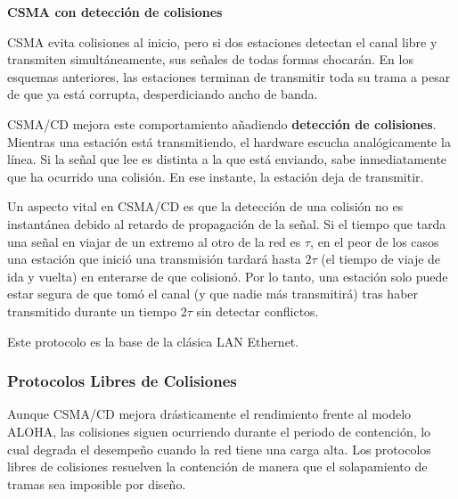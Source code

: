 \textbf{CSMA con detección de colisiones}

CSMA evita colisiones al inicio, pero si dos estaciones detectan el canal libre y transmiten simultáneamente, sus señales de todas formas chocarán. En los esquemas anteriores, las estaciones terminan de transmitir toda su trama a pesar de que ya está corrupta, desperdiciando ancho de banda. 

CSMA/CD mejora este comportamiento añadiendo \textbf{detección de colisiones}. Mientras una estación está transmitiendo, el hardware escucha analógicamente la línea. Si la señal que lee es distinta a la que está enviando, sabe inmediatamente que ha ocurrido una colisión. En ese instante, la estación deja de transmitir.

Un aspecto vital en CSMA/CD es que la detección de una colisión no es instantánea debido al retardo de propagación de la señal. Si el tiempo que tarda una señal en viajar de un extremo al otro de la red es $\tau$, en el peor de los casos una estación que inició una transmisión tardará hasta $2\tau$ (el tiempo de viaje de ida y vuelta) en enterarse de que colisionó. Por lo tanto, una estación solo puede estar segura de que tomó el canal (y que nadie más transmitirá) tras haber transmitido durante un tiempo $2\tau$ sin detectar conflictos.

Este protocolo es la base de la clásica LAN Ethernet.

\subsubsection{Protocolos Libres de Colisiones}

Aunque CSMA/CD mejora drásticamente el rendimiento frente al modelo ALOHA, las colisiones siguen ocurriendo durante el periodo de contención, lo cual degrada el desempeño cuando la red tiene una carga alta. Los protocolos libres de colisiones resuelven la contención de manera que el solapamiento de tramas sea imposible por diseño.

